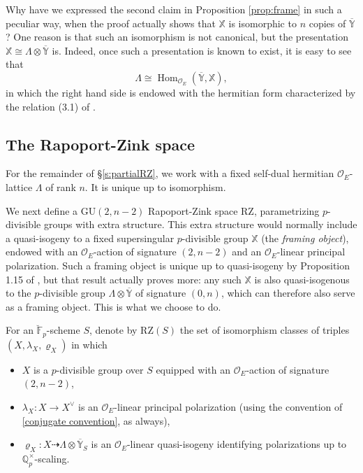 \documentclass[11pt]{alggeom}
\newcommand{\iso}{\cong}
\newcommand{\Q}{\mathbb Q}
\newcommand{\F}{\mathbb F}
\newcommand{\co}{\mathcal O}
\DeclareMathOperator{\Hom}{Hom}
\begin{document}
\begin{remark}\label{rem:KR isometry}
Why  have we expressed the second claim in Proposition \ref{prop:frame} in such a peculiar way, when the proof actually shows that $\mathbb{X}$ is isomorphic to $n$ copies of $\overline{\mathbb{Y}}$?
One reason is that such an isomorphism is not canonical, but the presentation $\mathbb{X} \iso\Lambda   \otimes  \overline{\mathbb{Y}}$ is.  Indeed, once such a presentation is known to exist, it is easy to see that 
\[
\Lambda \iso \Hom_{\co_E} ( \overline{\mathbb{Y}} , \mathbb{X} ),
\]
in which the right hand side is endowed with the  hermitian form  characterized by the relation  (3.1) of  \cite{KR1}.
\end{remark}





 
 \subsection{The Rapoport-Zink space}
 \label{ss:RZbasics}
 
 
 
 

For the remainder of \S \ref{s:partialRZ},  we work with a fixed  self-dual hermitian $\co_E$-lattice  $\Lambda$  of rank $n$.  It is unique up to isomorphism.



We next define a $\mathrm{GU}(2,n-2)$ Rapoport-Zink space $\mathrm{RZ}$, parametrizing $p$-divisible groups with extra structure.  This extra structure would normally include a  quasi-isogeny to a fixed supersingular $p$-divisible group $\mathbb{X}$ (the \emph{framing object}), endowed   with an $\co_E$-action of signature $(2,n-2)$ and an $\co_E$-linear principal polarization.  Such a framing object is unique up to quasi-isogeny by 
Proposition 1.15 of \cite{Vollaard}, but that result actually proves more:
any such $\mathbb{X}$  is  also  quasi-isogenous to  the $p$-divisible group   $\Lambda\otimes\overline{\mathbb{Y}}$ of signature $(0,n)$, which can therefore also serve as a framing object.  This is what we choose to do.

 
 

\begin{definition}\label{def:fullRZ}
 For an $\breve{\F}_p$-scheme $S$,  denote by $\mathrm{RZ}(S)$ the set of isomorphism classes of triples $(X,\lambda_X,\varrho_X)$ in which 
\begin{itemize}
\item
$X$ is a $p$-divisible group over $S$ equipped with an $\co_E$-action of signature $(2,n-2)$, 
\item
$\lambda_X : X \to X^\vee$ is an $\co_E$-linear principal polarization (using the convention of \eqref{conjugate convention}, as always), 
\item
$
\varrho_X :  X \dashrightarrow     \Lambda   \otimes  \overline{\mathbb{Y}}_S  
$
is an $\co_E$-linear quasi-isogeny identifying polarizations up to $\Q_p^\times$-scaling.
\end{itemize}
\end{definition}
\end{document}
